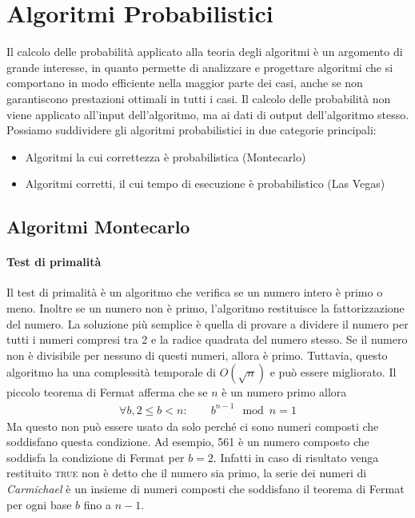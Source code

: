\chapter{Algoritmi Probabilistici}

Il calcolo delle probabilità applicato alla teoria degli algoritmi è un argomento di grande interesse, in quanto permette di analizzare e progettare algoritmi che si comportano in modo efficiente nella maggior parte dei casi, anche se non garantiscono prestazioni ottimali in tutti i casi. Il calcolo delle probabilità non viene applicato all'input dell'algoritmo, ma ai dati di output dell'algoritmo stesso. Possiamo suddividere gli algoritmi probabilistici in due categorie principali:
\begin{itemize}
    \item Algoritmi la cui correttezza è probabilistica (Montecarlo)
    \item Algoritmi corretti, il cui tempo di esecuzione è probabilistico (Las Vegas)
\end{itemize}

\section{Algoritmi Montecarlo}
    \subsubsection{Test di primalità}
        Il test di primalità è un algoritmo che verifica se un numero intero è primo o meno. Inoltre se un numero non è primo, l'algoritmo restituisce la fattorizzazione del numero.\newline
        La soluzione più semplice è quella di provare a dividere il numero per tutti i numeri compresi tra 2 e la radice quadrata del numero stesso. Se il numero non è divisibile per nessuno di questi numeri, allora è primo. Tuttavia, questo algoritmo ha una complessità temporale di $O(\sqrt{n})$ e può essere migliorato.\newline
        Il piccolo teorema di Fermat afferma che se $n$ è un numero primo allora
        \begin{align*}
            \forall b,2\leq b < n:\qquad b^{n-1} \mod n = 1
        \end{align*}
        Ma questo non può essere usato da solo perché ci sono numeri composti che soddisfano questa condizione. Ad esempio, 561 è un numero composto che soddisfa la condizione di Fermat per $b=2$. Infatti in caso di risultato venga restituito \textsc{true} non è detto che il numero sia primo, la serie dei numeri di \textit{Carmichael} è un insieme di numeri composti che soddisfano il teorema di Fermat per ogni base $b$ fino a $n-1$.
